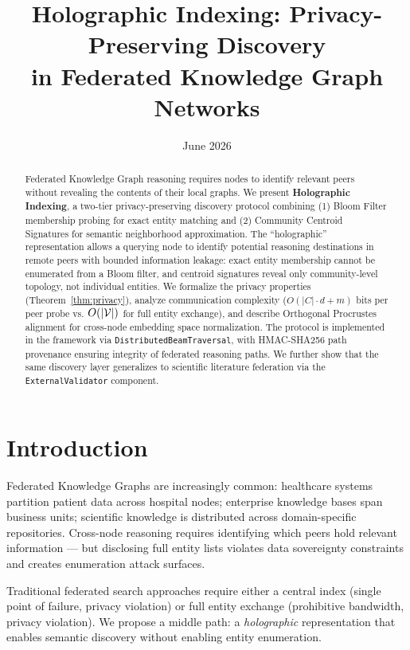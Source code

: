 \documentclass[10pt,twocolumn]{article}
\title{\textbf{Holographic Indexing: Privacy-Preserving Discovery\\
in Federated Knowledge Graph Networks}}
\date{June 2026}
\begin{document}
\maketitle

\begin{abstract}
Federated Knowledge Graph reasoning requires nodes to identify relevant peers without
revealing the contents of their local graphs. We present \textbf{Holographic Indexing},
a two-tier privacy-preserving discovery protocol combining (1) Bloom Filter membership
probing for exact entity matching and (2) Community Centroid Signatures for semantic
neighborhood approximation. The ``holographic'' representation allows a querying node
to identify potential reasoning destinations in remote peers with bounded information
leakage: exact entity membership cannot be enumerated from a Bloom filter, and centroid
signatures reveal only community-level topology, not individual entities. We formalize
the privacy properties (Theorem~\ref{thm:privacy}), analyze communication complexity
($O(|C| \cdot d + m)$ bits per peer probe vs. $O(|\mathcal{V}|)$ for full entity exchange),
and describe Orthogonal Procrustes alignment for cross-node embedding space
normalization. The protocol is implemented in the \CEREBRUM{} framework via
\texttt{DistributedBeamTraversal}, with HMAC-SHA256 path provenance ensuring integrity
of federated reasoning paths. We further show that the same discovery layer generalizes
to scientific literature federation via the \texttt{ExternalValidator} component.
\end{abstract}

\section{Introduction}
\label{sec:intro}

Federated Knowledge Graphs are increasingly common: healthcare systems partition patient
data across hospital nodes; enterprise knowledge bases span business units; scientific
knowledge is distributed across domain-specific repositories. Cross-node reasoning
requires identifying which peers hold relevant information — but disclosing full entity
lists violates data sovereignty constraints and creates enumeration attack surfaces.

Traditional federated search approaches require either a central index (single point of
failure, privacy violation) or full entity exchange (prohibitive bandwidth, privacy
violation). We propose a middle path: a \emph{holographic} representation that enables
semantic discovery without enabling entity enumeration.
\end{document}

